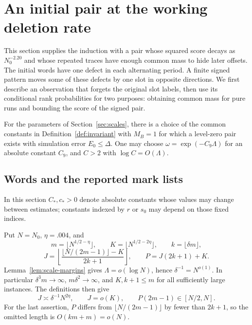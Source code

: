 \section{An initial pair at the working deletion rate}\label{sec:initial}

This section supplies the induction with a pair whose squared score decays as \(N_0^{-2.20}\) and whose repeated traces have enough common mass to hide later offsets. The initial words have one defect in each alternating period. A finite signed pattern moves some of these defects by one slot in opposite directions. We first describe an observation that forgets the original slot labels, then use its conditional rank probabilities for two purposes: obtaining common mass for pure runs and bounding the score of the signed pair.

\begin{proposition}\label{prop:initial}
For the parameters of Section~\ref{sec:scales}, there is a choice of the common constants in Definition~\ref{def:invariant} with \(M_B=1\) for which a level-zero pair exists with simulation error \(E_0\le\Delta\). One may choose
\(\omega=\exp(-C_9\Lambda)\) for an absolute constant \(C_9\), and \(C>2\) with \(\log C=O(\Lambda)\).
\end{proposition}

\subsection{Words and the reported mark lists}

In this section \(C_*,c_*>0\) denote absolute constants whose values may change between estimates; constants indexed by \(r\) or \(s_0\) may depend on those fixed indices.

Put \(N=N_0\), \(\eta=.004\), and
\[
 m=\lfloor N^{1/2-\eta}\rfloor,\qquad
 K=\lfloor N^{1/2-2\eta}\rfloor,\qquad
 k=\lfloor\delta m\rfloor,
\]
\[
 J=\left\lfloor
       \frac{\lfloor N/(2m-1)\rfloor-K}{2k+1}
    \right\rfloor,\qquad
 P=J(2k+1)+K.
\]
Lemma~\ref{lem:scale-margins} gives \(\Lambda=o(\log N)\), hence
\(\delta^{-1}=N^{o(1)}\). In particular \(\delta^3m\to\infty\),
\(m\delta^2\to\infty\), and \(K,k+1\le m\) for all sufficiently large instances. The definitions then give
\[
 J\asymp\delta^{-1}N^{2\eta},\qquad J=o(K),\qquad
 P(2m-1)\in[N/2,N].
\]
For the last assertion, \(P\) differs from \(\lfloor N/(2m-1)\rfloor\) by fewer than \(2k+1\), so the omitted length is \(O(km+m)=o(N)\).

